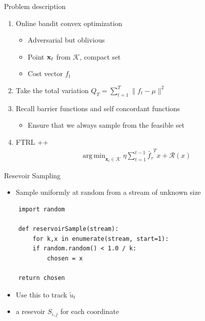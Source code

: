 \documentclass{beamer}
\DeclareMathOperator*{\argmin}{arg\,min}
\begin{document}
\begin{frame}{Problem description}
  \begin{enumerate}
    \item
    Online bandit convex optimization
    \begin{itemize}
      \item
        Adversarial but oblivious
      \item
        Point ${\bf x}_t$ from $\mathcal{K}$, compact set
      \item
        Cost vector $f_{t}$
      \end{itemize}
    \item
      Take the total variation
      $Q_T=\sum_{t=1}^T \| f_t - \mu \|^2$
    \item
      Recall barrier functions and self concordant functions
      \begin{itemize}
        \item
          Ensure that we always sample from the feasible set
        \end{itemize}
     \item
       FTRL ++
        \begin{align*}
          \argmin_{{\textbf{x}}_t\in\mathcal{K}}\eta \sum_{t=1}^{t-1} \tilde{f_{\tau}}^T x + \mathcal{R}(x)
        \end{align*}

    \end{enumerate}
  \end{frame}
       
\begin{frame}[fragile]{Resevoir Sampling}
  \begin{itemize}
  \item
      Sample uniformly at random from a stream of unknown size \footnotemark
 \end{itemize}

  \lstset{language=Python}
  \lstset{frame=lines}
  \lstset{basicstyle=\footnotesize}
  \begin{lstlisting}
    import random

    def reservoirSample(stream):
        for k,x in enumerate(stream, start=1):
        if random.random() < 1.0 / k:
            chosen = x

    return chosen
  \end{lstlisting}
  \begin{itemize}
    \item
      Use this to track $\tilde{u}_t$
     \item
       a resevoir $S_{i,j}$ for each coordinate 
  \end{itemize}
\end{frame}
\end{document}
